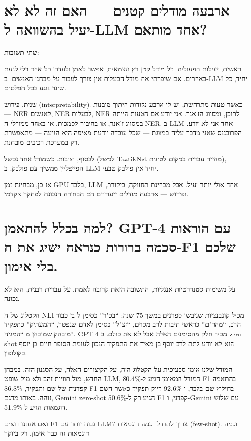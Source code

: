 \documentclass[12pt,a4paper]{article}
\begin{document}
\section{\texthebrew{ארבעה מודלים קטנים — האם זה לא לא יעיל בהשוואה ל-LLM אחד מותאם?}}
\begin{hebrew}
שתי תשובות:
\par
ראשית, יעילות תפעולית. כל מודל קטן רץ עצמאית, אפשר לאמן ולעדכן כל אחד בלי לגעת באחרים. אם שיפרתי את מודל הבעלות אין צורך לעבור על מבחני האנשים. ב-LLM יחיד, כל שינוי נוגע בכל הפלטים.
\par
שנית, פירוש (interpretability). כאשר טעות מתרחשת, יש לי ארבע נקודות חיתוך מובנות --- NER לאנשים, NER לבעלות, NER לתוכן, ומסווג הז'אנר. אני יודע אם הטעות הייתה במסווג ז'אנר, או בחיבור לסמכות, או באחד ממודלי ה-NER. ב-LLM אחד אני לא יודע. הפרובננס שאני מדבר עליה במצגת --- שכל עובדה יודעת מאיפה היא הגיעה --- מתאפשרת רק במערכת רכיבים מובחנת.
\par
לבסוף, יציבות: כשמודל אחד נכשל (למשל TaatikNet מחזיר עברית במקום לטינית), הפייפליין ממשיך עם פולבק. ב-LLM יחיד אין פולבק טבעי.
\par
אז כן, מבחינת זמן GPU בלבד, LLM אחד אולי יותר יעיל. אבל מבחינת תחזוקה, ביקורת, ופירוש --- ארבעה מודלים ייעודיים הם הבחירה הנכונה למחקר אקדמי.
\end{hebrew}


\section{\texthebrew{למה בכלל להתאמן? GPT-4 עם הוראות סכמה ברורות כנראה ישיג את ה-F1 שלכם בלי אימון.}}
\begin{hebrew}
על משימות סטנדרטיות אנגליות, התשובה הזאת קרובה לאמת. על עברית רבנית, היא לא נכונה.
\par
הקטלוג של ה-NLI מכיל קונבנציות שגיבשו ספרנים במשך 75 שנה: ``בכ"ר'' כסימן ל-בן כבוד הרב, ``מהר"ם'' כראשי תיבות לרב מסוים, ``זצ"ל'' כסימן לאדם שנפטר, ``המעתיק'' כתפקיד מובהק שמובחן מ-``המגיה''. GPT-4 מכיר חלק מהסימנים האלה אבל לא את כולם. ב-zero-shot הוא לא יודע לתת לרב יוסף בן מאיר את התפקיד הנכון לעומת הסופר חיים בן יוסף בקולופון.
\par
המודל שלנו אומן ספציפית על הקטלוג הזה, על הקיצורים האלה, על הסגנון הזה. במבחן החדש, מול תוויות זהב ולא מול שופט LLM, המודל המאומן הגיע ל-80.4\% F1 בהתאמה קפדנית של שם ותפקיד, 86.8\% F1 בחילוץ שם בלבד, ו-92.6\% דיוק תפקיד כאשר השם זוהה. באותו מדגם, Gemini zero-shot הגיע רק ל-50.6\% F1 קפדני, ו-Gemini עם שלוש דוגמאות הגיע ל-51.9\%.
\par
ואם אנחנו רוצים F1 גבוה יותר עם LLM? צריך לתת לו כמה דוגמאות (few-shot). וכמה דוגמאות זה כבר אימון, רק ביוקר.
\end{hebrew}
\end{document}
